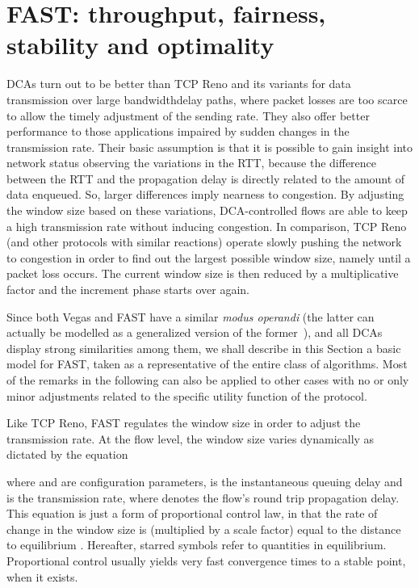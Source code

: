 \documentclass[english,times]{ettauth}
\begin{document}
\section{FAST: throughput, fairness, stability and optimality}
\label{sec:background}

DCAs turn out to be better than TCP Reno and its variants for data
transmission over large bandwidthdelay paths, where packet losses
are too scarce to allow the timely adjustment of the sending rate. They also
offer better performance to those applications impaired by sudden changes in
the transmission rate. Their basic assumption is that it is possible to gain
insight into network status observing the variations in the RTT, because the
difference between the RTT and the propagation delay is directly related to
the amount of data enqueued. So, larger differences imply nearness to
congestion. By adjusting the window size based on these variations,
DCA-controlled flows are able to keep a high transmission rate without
inducing congestion. In comparison, TCP Reno (and other protocols with similar
reactions) operate slowly pushing the network to congestion in order to find
out the largest possible window size, namely until a packet loss occurs. The
current window size is then reduced by a multiplicative factor and the
increment phase starts over again.

Since both Vegas and FAST have a similar \emph{modus operandi} (the latter
can actually be modelled as a generalized version of the former~\cite{Wei06}),
and all DCAs display strong similarities among them, we shall describe in this
Section a basic model for FAST, taken as a representative of the entire class
of algorithms. Most of the remarks in the following can also be applied to
other cases with no or only minor adjustments related to the specific utility
function of the protocol.

Like TCP Reno, FAST regulates the window size  in order to adjust the
transmission rate.  At the flow level, the window size varies dynamically as
dictated by the equation

where  and  are configuration parameters,  is the
instantaneous queuing delay and  is the
transmission rate, where  denotes the flow's round trip propagation delay.
This equation is just a form of proportional control law, in that the rate of
change in the window size is (multiplied by a scale factor) equal to the
distance to equilibrium . Hereafter, starred symbols
refer to quantities in equilibrium. Proportional control usually yields very
fast convergence times to a stable point, when it exists.
\end{document}
